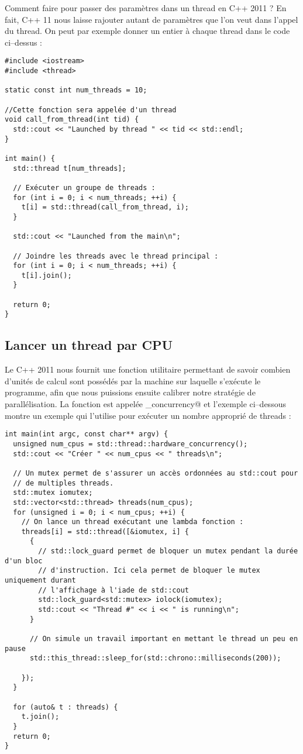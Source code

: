 \documentclass[fleqn,11pt]{article}
\begin{document}
Comment faire pour passer des paramètres dans un thread en C++ 2011 ? En fait, C++ 11 nous laisse rajouter
autant de paramètres que l'on veut dans l'appel du thread. On peut par exemple donner un entier à chaque thread dans le code
ci--dessus :

\begin{lstlisting}
#include <iostream>
#include <thread>

static const int num_threads = 10;

//Cette fonction sera appelée d'un thread
void call_from_thread(int tid) {
  std::cout << "Launched by thread " << tid << std::endl;
}

int main() {
  std::thread t[num_threads];

  // Exécuter un groupe de threads :
  for (int i = 0; i < num_threads; ++i) {
    t[i] = std::thread(call_from_thread, i);
  }

  std::cout << "Launched from the main\n";

  // Joindre les threads avec le thread principal :
  for (int i = 0; i < num_threads; ++i) {
    t[i].join();
  }

  return 0;
}
\end{lstlisting}


\subsection{Lancer un thread par CPU}

Le C++ 2011 nous fournit une fonction utilitaire permettant de savoir combien d'unités de calcul
sont possédés par la machine sur laquelle s'exécute le programme, afin que nous puissions ensuite
calibrer notre stratégie de parallélisation. La fonction est appelée \lstinline@hardware_concurrency@
et l'exemple ci--dessous montre un exemple qui l'utilise pour exécuter un nombre approprié de threads :

\begin{lstlisting}
int main(int argc, const char** argv) {
  unsigned num_cpus = std::thread::hardware_concurrency();
  std::cout << "Créer " << num_cpus << " threads\n";

  // Un mutex permet de s'assurer un accès ordonnées au std::cout pour
  // de multiples threads.
  std::mutex iomutex;
  std::vector<std::thread> threads(num_cpus);
  for (unsigned i = 0; i < num_cpus; ++i) {
    // On lance un thread exécutant une lambda fonction :
    threads[i] = std::thread([&iomutex, i] {
      {
        // std::lock_guard permet de bloquer un mutex pendant la durée d'un bloc
        // d'instruction. Ici cela permet de bloquer le mutex uniquement durant
        // l'affichage à l'iade de std::cout
        std::lock_guard<std::mutex> iolock(iomutex);
        std::cout << "Thread #" << i << " is running\n";
      }

      // On simule un travail important en mettant le thread un peu en pause
      std::this_thread::sleep_for(std::chrono::milliseconds(200));

    });
  }

  for (auto& t : threads) {
    t.join();
  }
  return 0;
} 
\end{lstlisting}
\end{document}
